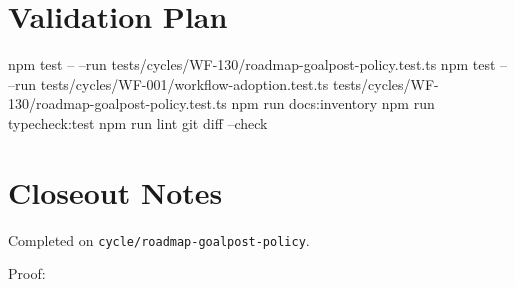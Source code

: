 \section{Validation Plan}\label{record-212-validation-plan}

\begin{CodeBlock}
npm test -- --run tests/cycles/WF-130/roadmap-goalpost-policy.test.ts
npm test -- --run tests/cycles/WF-001/workflow-adoption.test.ts tests/cycles/WF-130/roadmap-goalpost-policy.test.ts
npm run docs:inventory
npm run typecheck:test
npm run lint
git diff --check
\end{CodeBlock}

\section{Closeout Notes}\label{record-212-closeout-notes}

Completed on \texttt{c\allowbreak{}y\allowbreak{}c\allowbreak{}l\allowbreak{}e\allowbreak{}/\allowbreak{}r\allowbreak{}o\allowbreak{}a\allowbreak{}d\allowbreak{}m\allowbreak{}a\allowbreak{}p\allowbreak{}-\allowbreak{}g\allowbreak{}o\allowbreak{}a\allowbreak{}l\allowbreak{}p\allowbreak{}o\allowbreak{}s\allowbreak{}t\allowbreak{}-\allowbreak{}p\allowbreak{}o\allowbreak{}l\allowbreak{}i\allowbreak{}c\allowbreak{}y}.

Proof:

